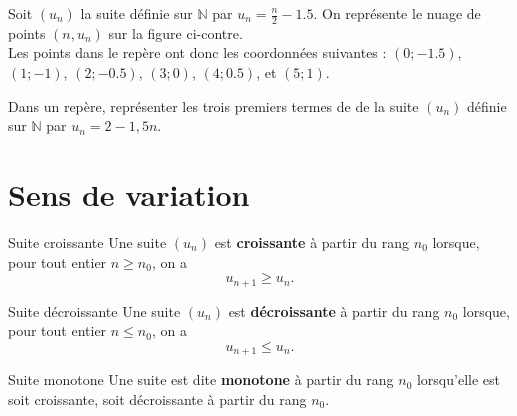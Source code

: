 \documentclass[11pt]{article}
\begin{document}
\begin{exemple}
\begin{minipage}{.5\textwidth}
  Soit $(u_n)$ la suite définie sur $\mathbb{N}$ par $u_n=\frac{n}{2}-1.5$. On
  représente le nuage de points $(n, u_n)$ sur la figure ci-contre.\\
  Les points
  dans le repère ont donc les coordonnées suivantes :
  $(0; -1.5)$,
  $(1; -1)$,
  $(2; -0.5)$,
  $(3; 0)$,
  $(4; 0.5)$, et
  $(5; 1)$.
\end{minipage}
\begin{minipage}{.5\textwidth}
\begin{center}
\end{center}
\end{minipage}
\end{exemple}

\begin{app}
  Dans un repère, représenter les trois premiers termes de de la suite $(u_n)$
  définie sur $\mathbb{N}$ par $u_n=2-1,5n$.
\end{app}

\section{Sens de variation}

\begin{defi}{Suite croissante}
  Une suite $(u_n)$ est \textbf{croissante} à partir du rang $n_0$ lorsque, pour
  tout entier $n\geq n_0$, on a 
  \[
    u_{n+1}\geq u_n.
  \]
\end{defi}

\begin{defi}{Suite décroissante}
  Une suite $(u_n)$ est \textbf{décroissante} à partir du rang $n_0$ lorsque, pour
  tout entier $n\leq n_0$, on a 
  \[
    u_{n+1}\leq u_n.
  \]
\end{defi}

\begin{defi}{Suite monotone}
  Une suite est dite \textbf{monotone} à partir du rang $n_0$ lorsqu'elle est
  soit croissante, soit décroissante à partir du rang $n_0$.
\end{defi}
\end{document}
